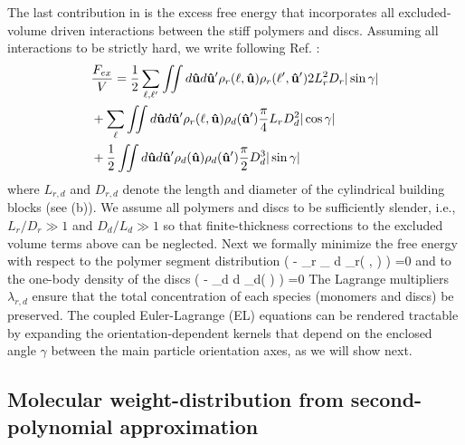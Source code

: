 The last contribution in  is the excess free energy that incorporates all excluded-volume driven interactions between the stiff polymers and discs. Assuming all interactions to be strictly hard, we write following Ref. \cite{stroobants1984}:
\begin{align}
& \frac{F_{ex}}{ V}  =  \frac{1}{2}   \sum_{\ell, \ell^{\prime}}  \iint d  {\bf \hat{u}}  d {\bf \hat{u}}^{\prime} \rho_{r}(\ell, {\bf \hat{u}})  \rho_{r}(\ell^{\prime}, {\bf \hat{u}}^{\prime})  2  L_{r}^{2} D_{r}  | \sin \gamma |  \nonumber \\
& +    \sum_{\ell}  \iint d  {\bf \hat{u}}  d {\bf \hat{u}}^{\prime} \rho_{r}(\ell, {\bf \hat{u}}) \rho_{d}( {\bf \hat{u}}^{\prime})  \frac{\pi}{4}  L_{r} D_{d}^{2}  | \cos \gamma |  \nonumber \\
& +  \frac{1}{2} \iint d  {\bf \hat{u}}  d {\bf \hat{u}}^{\prime} \rho_{d}( {\bf \hat{u}}) \rho_{d}( {\bf \hat{u}}^{\prime})  \frac{\pi}{2} D_{d}^{3}  | \sin \gamma |  
\label{fex}
\end{align}
where $L_{r,d}$ and $D_{r,d}$ denote the length and diameter of the cylindrical building blocks (see (b)).  We assume all polymers and discs to be sufficiently slender, i.e., $L_{r}/D_{r} \gg 1$ and $D_{d}/L_{d} \gg 1$ so that finite-thickness corrections to the excluded volume terms above can be neglected.   Next we formally minimize the free energy with respect to the polymer segment distribution
\beq
{} \left (  - \lambda_{r} \sum_{  \ell} \int d \oma \rho_{r}( \ell, \oma ) \right ) =0
\label{el1}
\eeq
and to the one-body density of the discs
\beq
{} \left (  - \lambda_{d}  \int d \oma \rho_{d}(  \oma ) \right ) =0
\label{el2}
\eeq
The Lagrange multipliers $\lambda_{r,d}$ ensure that the total concentration of each species (monomers and discs) be preserved.  The coupled Euler-Lagrange (EL) equations can be rendered tractable by expanding the orientation-dependent kernels that depend on the enclosed angle $\gamma$ between the main particle orientation axes, as we will show next.


\subsection{Molecular weight-distribution from second-polynomial approximation}

